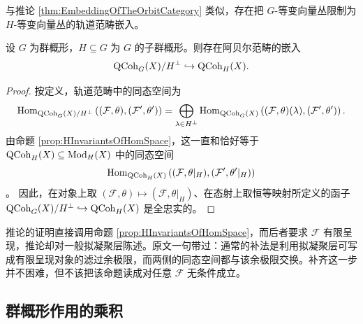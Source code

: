 与推论 \ref{thm:EmbeddingOfTheOrbitCategory} 类似，存在把 $G$-等变向量丛限制为 $H$-等变向量丛的轨道范畴嵌入。

\begin{crl}\label{crl:orbit-category-GH-restriction}
    设 $G$ 为群概形，$H\subseteq G$ 为 $G$ 的子群概形。则存在阿贝尔范畴的嵌入 \[
        \operatorname{\mathrm{QCoh}}_G (X)/H^{\perp}\hookrightarrow\operatorname{\mathrm{QCoh}}_H (X).
    \]
\end{crl}
\begin{proof}
按定义，轨道范畴中的同态空间为
$$
\operatorname{Hom}_{\operatorname{\mathrm{QCoh}}_G(X)/H^\perp}\left( (\mathcal{F}, \theta), (\mathcal{F}', \theta') \right)
=
\bigoplus_{\operatorname{\lambda} \in H^\perp} \operatorname{Hom}_{\operatorname{\mathrm{QCoh}}_G(X)}\left( (\mathcal{F}, \theta)(\operatorname{\lambda}), (\mathcal{F}', \theta') \right).
$$
由命题 \ref{prop:HInvariantsOfHomSpace}，这一直和恰好等于 $\operatorname{\mathrm{QCoh}}_H(X)\subseteq\operatorname{\mathrm{Mod}}_H(X)$ 中的同态空间
\[\operatorname{Hom}_{\operatorname{\mathrm{QCoh}}_H(X)}
\left((\mathcal{F}, \theta|_H), (\mathcal{F}', \theta'|_H) \right)\]。
因此，在对象上取 $(\mathcal{F}, \theta) \mapsto (\mathcal{F},\theta|_H)$、在态射上取恒等映射所定义的函子 $\operatorname{\mathrm{QCoh}}_G(X)/H^\perp \hookrightarrow\operatorname{\mathrm{QCoh}}_H(X)$ 是全忠实的。
\end{proof}

\begin{yizhu}[推论略去的前提]
推论的证明直接调用命题 \ref{prop:HInvariantsOfHomSpace}，而后者要求 $\mathcal{F}$ 有限呈现，推论却对一般拟凝聚层陈述。原文一句带过：通常的补法是利用拟凝聚层可写成有限呈现对象的滤过余极限，而两侧的同态空间都与该余极限交换。补齐这一步并不困难，但不该把该命题读成对任意 $\mathcal{F}$ 无条件成立。
\end{yizhu}

\subsection{群概形作用的乘积}

